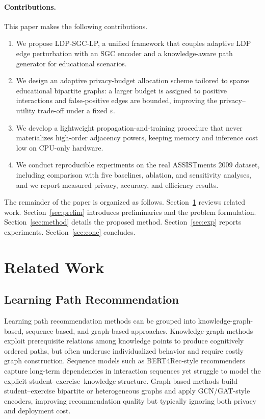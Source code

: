 \documentclass[sn-mathphys]{sn-jnl}
\begin{document}
\paragraph{Contributions.} This paper makes the following contributions.
\begin{enumerate}
  \item We propose LDP-SGC-LP, a unified framework that couples adaptive LDP edge perturbation with an SGC encoder and a knowledge-aware path generator for educational scenarios.
  \item We design an adaptive privacy-budget allocation scheme tailored to sparse educational bipartite graphs: a larger budget is assigned to positive interactions and false-positive edges are bounded, improving the privacy--utility trade-off under a fixed $\varepsilon$.
  \item We develop a lightweight propagation-and-training procedure that never materializes high-order adjacency powers, keeping memory and inference cost low on CPU-only hardware.
  \item We conduct reproducible experiments on the real ASSISTments 2009 dataset, including comparison with five baselines, ablation, and sensitivity analyses, and we report measured privacy, accuracy, and efficiency results.
\end{enumerate}

The remainder of the paper is organized as follows. Section~\ref{sec:related} reviews related work. Section~\ref{sec:prelim} introduces preliminaries and the problem formulation. Section~\ref{sec:method} details the proposed method. Section~\ref{sec:exp} reports experiments. Section~\ref{sec:conc} concludes.

\section{Related Work}
\label{sec:related}

\subsection{Learning Path Recommendation}
Learning path recommendation methods can be grouped into knowledge-graph-based, sequence-based, and graph-based approaches. Knowledge-graph methods exploit prerequisite relations among knowledge points to produce cognitively ordered paths, but often underuse individualized behavior and require costly graph construction. Sequence models such as BERT4Rec-style recommenders capture long-term dependencies in interaction sequences yet struggle to model the explicit student--exercise--knowledge structure. Graph-based methods build student--exercise bipartite or heterogeneous graphs and apply GCN/GAT-style encoders, improving recommendation quality but typically ignoring both privacy and deployment cost.
\end{document}
